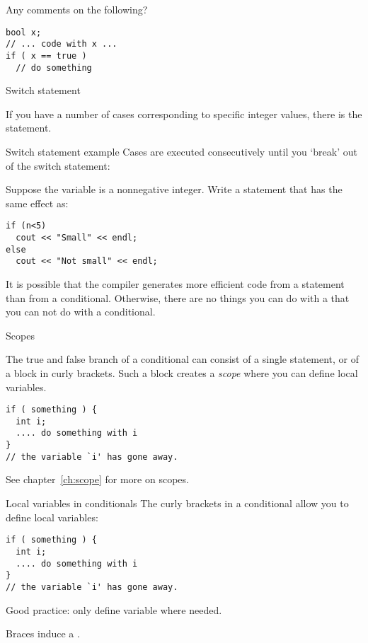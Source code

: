 \begin{review}
  \label{q:true}
  Any comments on the following?
\begin{lstlisting}
bool x;
// ... code with x ...
if ( x == true )
  // do something
\end{lstlisting}
  
\end{review}

 {Switch statement}

If you have a number of cases corresponding to specific integer
values, there is the  statement.

\begin{block}{Switch statement example}
  \label{sl:switch}
  Cases are executed consecutively until you `break' out of the switch
  statement:
\end{block}

\begin{exercise}
  \label{ex:switch-range}
  Suppose the variable  is a nonnegative integer. Write a
   statement that has the same effect as:
\begin{lstlisting}
if (n<5)
  cout << "Small" << endl;
else
  cout << "Not small" << endl;
\end{lstlisting}
\end{exercise}

It is possible that the compiler generates more efficient code
from a  statement than from a conditional.
Otherwise, there are no things you can do with a 
that you can not do with a conditional.

 {Scopes}

The true and false branch of a conditional can consist of a single
statement, or of a block in curly brackets. Such a block creates a
%
\emph{scope}
%
where you can define local variables.

\begin{lstlisting}
if ( something ) {
  int i; 
  .... do something with i
}
// the variable `i' has gone away.
\end{lstlisting}

See chapter~\ref{ch:scope} for more on scopes.

\begin{slide}{Local variables in conditionals}
  \label{sl:if-scope}
  The curly brackets in a conditional allow you to define local variables:
\begin{lstlisting}
if ( something ) {
  int i; 
  .... do something with i
}
// the variable `i' has gone away.
\end{lstlisting}
Good practice: only define variable where needed.

Braces induce a .
\end{slide}

